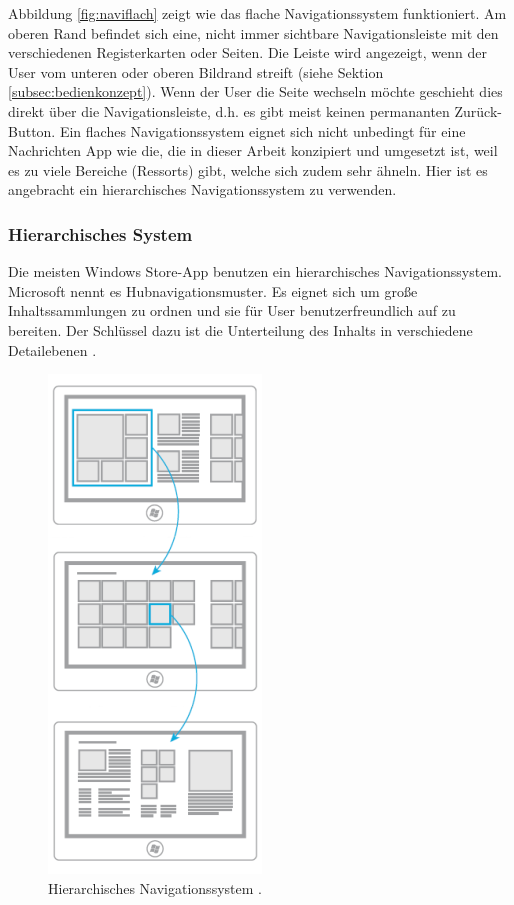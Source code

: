 \documentclass[12pt,a4paper,bibtotoc]{scrartcl}
\begin{document}
Abbildung \ref{fig:naviflach} zeigt wie das flache Navigationssystem funktioniert. Am oberen Rand befindet sich eine, nicht immer sichtbare Navigationsleiste mit den verschiedenen Registerkarten oder Seiten. Die Leiste wird angezeigt, wenn der User vom unteren oder oberen Bildrand streift (siehe Sektion \ref{subsec:bedienkonzept}). Wenn der User die Seite wechseln möchte geschieht dies  direkt über die Navigationsleiste, d.h. es gibt meist keinen permananten Zurück-Button. Ein flaches Navigationssystem eignet sich nicht unbedingt für eine Nachrichten App wie die, die in dieser Arbeit konzipiert und umgesetzt ist, weil es zu viele Bereiche (Ressorts) gibt, welche sich zudem sehr ähneln. Hier ist es angebracht ein hierarchisches Navigationssystem zu verwenden.    



\subsubsection{Hierarchisches System}
\label{subsubsec:hierachischessystem}
Die meisten Windows Store-App benutzen ein hierarchisches Navigationssystem. Microsoft nennt es Hubnavigationsmuster. Es eignet sich um große Inhaltssammlungen zu ordnen und sie für User benutzerfreundlich auf zu bereiten. Der Schlüssel dazu ist die Unterteilung des Inhalts in verschiedene Detailebenen \citep{MicrosoftNavidesign2013}.

\begin{figure}[h]	
	\centering
	\includegraphics[scale=1]{Bilder/Abbildungen/ms_navigation_hierarchie} 
	\caption{Hierarchisches Navigationssystem \protect\citep{MicrosoftNavidesign2013}.}
	\label{fig:navihierarchisch}
\end{figure}
\end{document}

